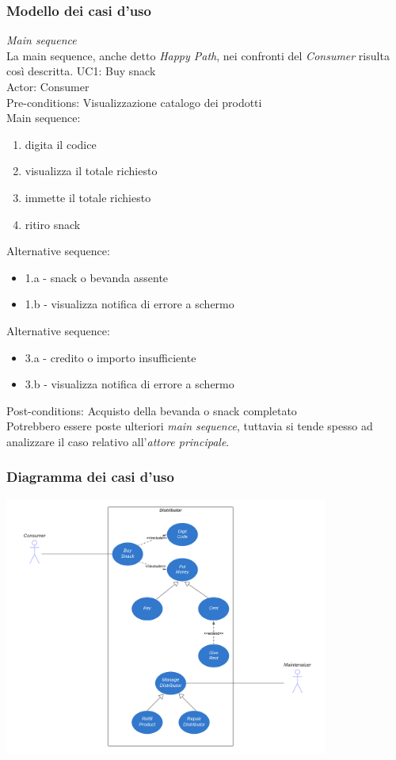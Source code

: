 \documentclass{article}
\begin{document}
\subsubsection*{Modello dei casi d'uso}
\textit{Main sequence}\\ La main sequence, anche detto \textit{Happy Path}, nei confronti del \textit{Consumer} risulta così descritta.\vspace{14pt}
UC1: Buy snack\\
Actor: Consumer\\
Pre-conditions: Visualizzazione catalogo dei prodotti\\
Main sequence:
\begin{enumerate}[label={\arabic* -}, leftmargin=3.65cm]
    \itemsep0em
    \item digita il codice
    \item visualizza il totale richiesto
    \item immette il totale richiesto
    \item ritiro snack
\end{enumerate}
Alternative sequence:
\begin{itemize}[label={ },leftmargin=3.02cm]
    \itemsep0em
    \item 1.a - snack o bevanda assente
    \item 1.b - visualizza notifica di errore a schermo
\end{itemize}
Alternative sequence: 
\begin{itemize}[label={ }, leftmargin=3.02cm]
    \itemsep0em
    \item 3.a - credito o importo insufficiente
    \item 3.b - visualizza notifica di errore a schermo
\end{itemize}
Post-conditions: Acquisto della bevanda o snack completato\vspace{14pt}\\
Potrebbero essere poste ulteriori \textit{main sequence}, tuttavia si tende spesso ad analizzare il caso relativo all'\textit{attore principale}.
\subsubsection*{Diagramma dei casi d'uso}
\begin{center}
    \includegraphics[width=0.8\textwidth]{foto 1.png}
\end{center}
\end{document}
